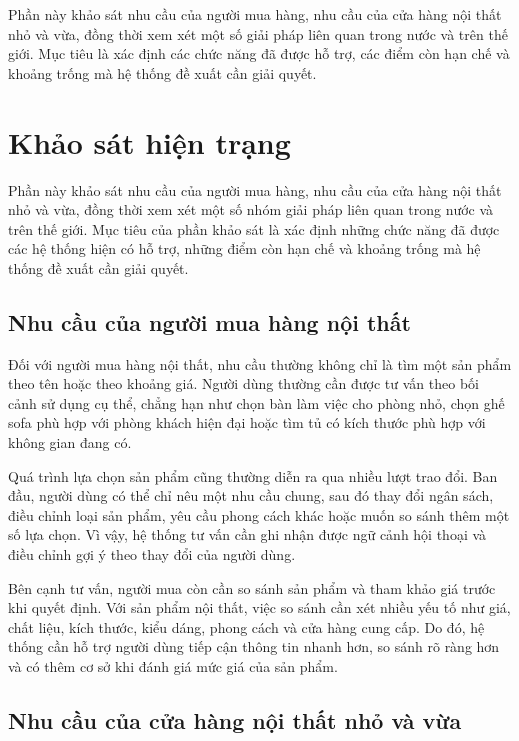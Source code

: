 \documentclass[../DoAn.tex]{subfiles}
\begin{document}
Phần này khảo sát nhu cầu của người mua hàng, nhu cầu của cửa hàng nội thất nhỏ và vừa, đồng thời xem xét một số giải pháp liên quan trong nước và trên thế giới. Mục tiêu là xác định các chức năng đã được hỗ trợ, các điểm còn hạn chế và khoảng trống mà hệ thống đề xuất cần giải quyết.
 
\section{Khảo sát hiện trạng}
\label{section:2.1}

Phần này khảo sát nhu cầu của người mua hàng, nhu cầu của cửa hàng nội thất nhỏ và vừa, đồng thời xem xét một số nhóm giải pháp liên quan trong nước và trên thế giới. Mục tiêu của phần khảo sát là xác định những chức năng đã được các hệ thống hiện có hỗ trợ, những điểm còn hạn chế và khoảng trống mà hệ thống đề xuất cần giải quyết.

\subsection{Nhu cầu của người mua hàng nội thất}
\label{subsection:2.1.1}

Đối với người mua hàng nội thất, nhu cầu thường không chỉ là tìm một sản phẩm theo tên hoặc theo khoảng giá. Người dùng thường cần được tư vấn theo bối cảnh sử dụng cụ thể, chẳng hạn như chọn bàn làm việc cho phòng nhỏ, chọn ghế sofa phù hợp với phòng khách hiện đại hoặc tìm tủ có kích thước phù hợp với không gian đang có.

Quá trình lựa chọn sản phẩm cũng thường diễn ra qua nhiều lượt trao đổi. Ban đầu, người dùng có thể chỉ nêu một nhu cầu chung, sau đó thay đổi ngân sách, điều chỉnh loại sản phẩm, yêu cầu phong cách khác hoặc muốn so sánh thêm một số lựa chọn. Vì vậy, hệ thống tư vấn cần ghi nhận được ngữ cảnh hội thoại và điều chỉnh gợi ý theo thay đổi của người dùng.

Bên cạnh tư vấn, người mua còn cần so sánh sản phẩm và tham khảo giá trước khi quyết định. Với sản phẩm nội thất, việc so sánh cần xét nhiều yếu tố như giá, chất liệu, kích thước, kiểu dáng, phong cách và cửa hàng cung cấp. Do đó, hệ thống cần hỗ trợ người dùng tiếp cận thông tin nhanh hơn, so sánh rõ ràng hơn và có thêm cơ sở khi đánh giá mức giá của sản phẩm.
\subsection{Nhu cầu của cửa hàng nội thất nhỏ và vừa}
\label{subsection:2.1.2}
\end{document}
